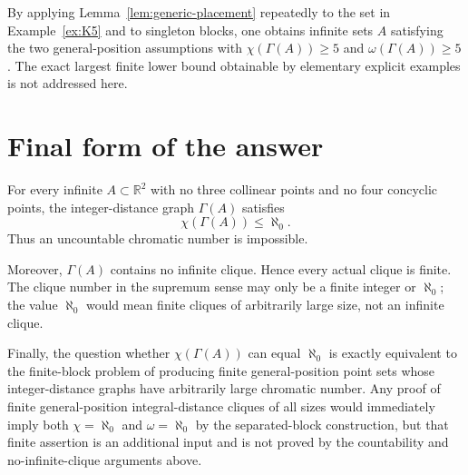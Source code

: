\documentclass[11pt,a4paper]{amsart}
\theoremstyle{definition}
\newcommand{\R}{\mathbb{R}}
\begin{document}
By applying Lemma~\ref{lem:generic-placement} repeatedly to the set in Example~\ref{ex:K5} and to singleton blocks, one obtains infinite sets $A$ satisfying the two general-position assumptions with $\chi(\Gamma(A))\geq 5$ and $\omega(\Gamma(A))\geq 5$.  The exact largest finite lower bound obtainable by elementary explicit examples is not addressed here.

\section{Final form of the answer}

For every infinite $A\subset\R^2$ with no three collinear points and no four concyclic points, the integer-distance graph $\Gamma(A)$ satisfies
\[
        \chi(\Gamma(A))\leq \aleph_0.
\]
Thus an uncountable chromatic number is impossible.

Moreover, $\Gamma(A)$ contains no infinite clique.  Hence every actual clique is finite.  The clique number in the supremum sense may only be a finite integer or $\aleph_0$; the value $\aleph_0$ would mean finite cliques of arbitrarily large size, not an infinite clique.

Finally, the question whether $\chi(\Gamma(A))$ can equal $\aleph_0$ is exactly equivalent to the finite-block problem of producing finite general-position point sets whose integer-distance graphs have arbitrarily large chromatic number.  Any proof of finite general-position integral-distance cliques of all sizes would immediately imply both $\chi=\aleph_0$ and $\omega=\aleph_0$ by the separated-block construction, but that finite assertion is an additional input and is not proved by the countability and no-infinite-clique arguments above.
\end{document}
